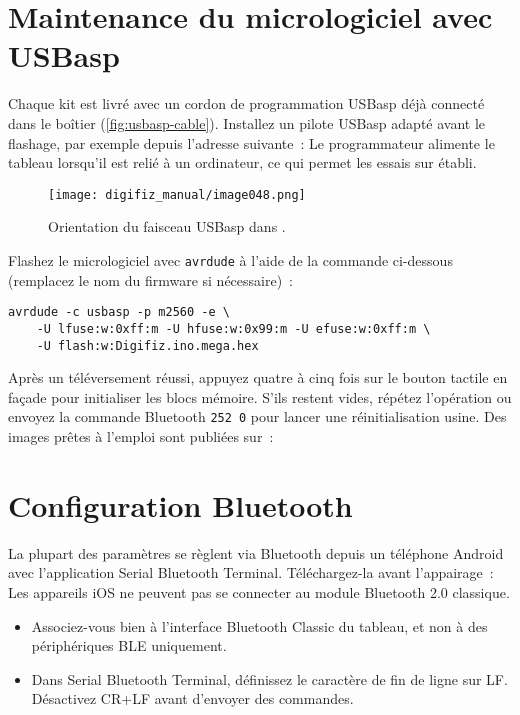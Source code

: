 \section{Maintenance du micrologiciel avec USBasp}
Chaque kit est livré avec un cordon de programmation USBasp déjà connecté dans le boîtier (\autoref{fig:usbasp-cable}). Installez un pilote USBasp adapté avant le flashage, par exemple depuis l'adresse suivante~:
Le programmateur alimente le tableau lorsqu'il est relié à un ordinateur, ce qui permet les essais sur établi.

\begin{figure}[htbp]
    \centering
    \texttt{[image: digifiz\_manual/image048.png]}
    \caption{Orientation du faisceau USBasp dans \ReplicaGenOne{}.}
    \label{fig:usbasp-cable}
\end{figure}

Flashez le micrologiciel avec \texttt{avrdude} à l'aide de la commande ci-dessous (remplacez le nom du firmware si nécessaire)~:

\begin{verbatim}
avrdude -c usbasp -p m2560 -e \
    -U lfuse:w:0xff:m -U hfuse:w:0x99:m -U efuse:w:0xff:m \
    -U flash:w:Digifiz.ino.mega.hex
\end{verbatim}

Après un téléversement réussi, appuyez quatre à cinq fois sur le bouton tactile en façade pour initialiser les blocs mémoire. S'ils restent vides, répétez l'opération ou envoyez la commande Bluetooth \verb|252 0| pour lancer une réinitialisation usine. Des images prêtes à l'emploi sont publiées sur~:

\section{Configuration Bluetooth}
La plupart des paramètres se règlent via Bluetooth depuis un téléphone Android avec l'application Serial Bluetooth Terminal. Téléchargez-la avant l'appairage~:
Les appareils iOS ne peuvent pas se connecter au module Bluetooth 2.0 classique.

\begin{itemize}
    \item Associez-vous bien à l'interface Bluetooth Classic du tableau, et non à des périphériques BLE uniquement.
    \item Dans Serial Bluetooth Terminal, définissez le caractère de fin de ligne sur LF. Désactivez CR+LF avant d'envoyer des commandes.
\end{itemize}

